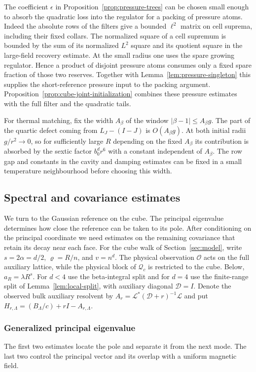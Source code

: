 \documentclass[11pt]{article}
\theoremstyle{definition}
\begin{document}
The coefficient \(\epsilon\) in Proposition~\ref{prop:pressure-trees}
can be chosen small enough to absorb the quadratic loss into the
regulator for a packing of pressure atoms.
Indeed the absolute rows of the filters give a bounded
\(\ell^2\) matrix on cell suprema, including their fixed collars.
The normalized square of a cell supremum is bounded by the sum
of its normalized \(L^2\) square and its quotient square in the
large-field recovery estimate. At the small radius one uses the
spare growing regulator. Hence a product of disjoint pressure
atoms consumes only a fixed spare fraction of those two reserves.
Together with Lemma~\ref{lem:pressure-singleton} this supplies
the short-reference pressure input to the packing argument.
Proposition~\ref{prop:cube-joint-initialization} combines these
pressure estimates with the full filter and the quadratic tails.

For thermal matching, fix the width \(A_\beta\) of the window
\(|\beta-1|\le A_\beta g\). The part of the quartic defect coming
from \(L_J-(I-J)\) is \(O(A_\beta g)\). At both initial radii
\(g/r^2\to0\), so for sufficiently large \(R\) depending on the
fixed \(A_\beta\) its contribution is absorbed by the sextic
factor \(b_0^d r^6\) with a constant independent of \(A_\beta\).
The row gap and constants in the cavity and damping estimates
can be fixed in a small temperature neighbourhood before
choosing this width.

\subsection{Spectral and covariance estimates}\label{sec:ext-cov}
We turn to the Gaussian reference on the cube. The principal
eigenvalue determines how close the reference can be taken to its
pole. After conditioning on the principal coordinate we need estimates
on the remaining covariance that retain its decay near each face.
For the cube walk of Section~\ref{sec:model}, write \(s=2\alpha=d/2\),
\(\varrho=R/n\), and \(v=n^d\). The physical observation \(\mathcal O\)
acts on the full auxiliary lattice, while the physical block of
\(\mathcal Q_c\) is restricted to the cube. Below, \(a_R=\lambda R^s\).
For \(d<4\) use the beta-integral split and for \(d=4\) use the
finite-range split of Lemma~\ref{lem:local-split}, with auxiliary diagonal
\(\mathcal D=I\). Denote the observed bulk auxiliary resolvent by
\(A_r=\mathcal L^*(\mathcal D+r)^{-1}\mathcal L\) and put
\(H_{r,\Lambda}=(B_\Lambda/c)+rI-A_{r,\Lambda}\).

\subsubsection{Generalized principal eigenvalue}
The first two estimates locate the pole and separate it from the
next mode. The last two control the principal vector and its overlap
with a uniform magnetic field.
\end{document}
